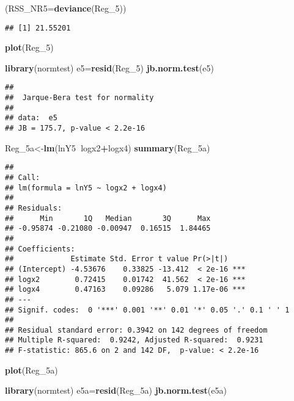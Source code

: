 \documentclass[
]{article}
\newenvironment{Shaded}{\begin{snugshade}}{\end{snugshade}}
\newcommand{\DataTypeTok}[1]{\textcolor[rgb]{0.13,0.29,0.53}{#1}}
\newcommand{\DecValTok}[1]{\textcolor[rgb]{0.00,0.00,0.81}{#1}}
\newcommand{\KeywordTok}[1]{\textcolor[rgb]{0.13,0.29,0.53}{\textbf{#1}}}
\newcommand{\NormalTok}[1]{#1}
\newcommand{\OperatorTok}[1]{\textcolor[rgb]{0.81,0.36,0.00}{\textbf{#1}}}
\begin{document}
\begin{Shaded}
\begin{Highlighting}[]
\NormalTok{(}\DataTypeTok{RSS_NR5=}\KeywordTok{deviance}\NormalTok{(Reg_}\DecValTok{5}\NormalTok{))}
\end{Highlighting}
\end{Shaded}

\begin{verbatim}
## [1] 21.55201
\end{verbatim}

\begin{Shaded}
\begin{Highlighting}[]
\KeywordTok{plot}\NormalTok{(Reg_}\DecValTok{5}\NormalTok{)}

\KeywordTok{library}\NormalTok{(normtest)}
\NormalTok{e5=}\KeywordTok{resid}\NormalTok{(Reg_}\DecValTok{5}\NormalTok{)}
\KeywordTok{jb.norm.test}\NormalTok{(e5)}
\end{Highlighting}
\end{Shaded}

\begin{verbatim}
## 
##  Jarque-Bera test for normality
## 
## data:  e5
## JB = 175.7, p-value < 2.2e-16
\end{verbatim}

\begin{Shaded}
\begin{Highlighting}[]
\NormalTok{Reg_5a<-}\KeywordTok{lm}\NormalTok{(lnY5}\OperatorTok{~}\NormalTok{logx2}\OperatorTok{+}\NormalTok{logx4)}
\KeywordTok{summary}\NormalTok{(Reg_5a)}
\end{Highlighting}
\end{Shaded}

\begin{verbatim}
## 
## Call:
## lm(formula = lnY5 ~ logx2 + logx4)
## 
## Residuals:
##      Min       1Q   Median       3Q      Max 
## -0.95874 -0.21080 -0.00947  0.16515  1.84465 
## 
## Coefficients:
##             Estimate Std. Error t value Pr(>|t|)    
## (Intercept) -4.53676    0.33825 -13.412  < 2e-16 ***
## logx2        0.72415    0.01742  41.562  < 2e-16 ***
## logx4        0.47163    0.09286   5.079 1.17e-06 ***
## ---
## Signif. codes:  0 '***' 0.001 '**' 0.01 '*' 0.05 '.' 0.1 ' ' 1
## 
## Residual standard error: 0.3942 on 142 degrees of freedom
## Multiple R-squared:  0.9242, Adjusted R-squared:  0.9231 
## F-statistic: 865.6 on 2 and 142 DF,  p-value: < 2.2e-16
\end{verbatim}

\begin{Shaded}
\begin{Highlighting}[]
\KeywordTok{plot}\NormalTok{(Reg_5a)}

\KeywordTok{library}\NormalTok{(normtest)}
\NormalTok{e5a=}\KeywordTok{resid}\NormalTok{(Reg_5a)}
\KeywordTok{jb.norm.test}\NormalTok{(e5a)}
\end{Highlighting}
\end{Shaded}
\end{document}
